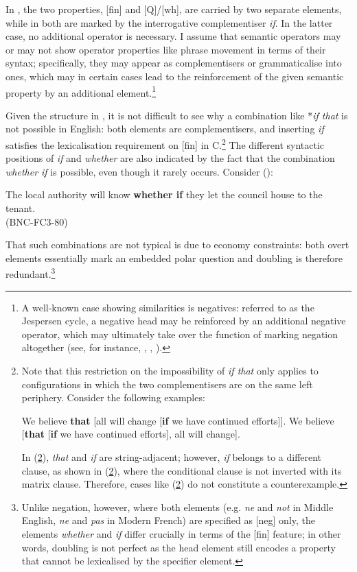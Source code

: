 In , the two properties, [fin] and [Q]/[wh], are carried by two separate elements, while in  both are marked by the interrogative complementiser \textit{if}. In the latter case, no additional operator is necessary. I assume that semantic operators may or may not show operator properties like phrase movement in terms of their syntax; specifically, they may appear as complementisers or grammaticalise into ones, which may in certain cases lead to the reinforcement of the given semantic property by an additional element.\footnote{A well-known case showing similarities is negatives: referred to as the Jespersen cycle, a negative head may be reinforced by an additional negative operator, which may ultimately take over the function of marking negation altogether (see, for instance, \citealt{wallage2008}, \citealt{vanderauwera2009}, \citealt{hoeksema2009}).}\largerpage

Given the structure in , it is not difficult to see why a combination like *\textit{if that} is not possible in English: both elements are complementisers, and inserting \textit{if} satisfies the lexicalisation requirement on [fin] in C.{\footnote{Note that this restriction on the impossibility of \textit{if that} only applies to configurations in which the two complementisers are on the same left periphery. Consider the following examples:

\ea We believe \textbf{that} [all will change [\textbf{if} we have continued efforts]]. \label{believethatif}
\ex We believe [\textbf{that} [\textbf{if} we have continued efforts], all will change]. \label{believeifthat}
\z

In (\ref{believeifthat}), \textit{that} and \textit{if} are string-adjacent; however, \textit{if} belongs to a different clause, as shown in (\ref{believethatif}), where the conditional clause is not inverted with its matrix clause. Therefore, cases like (\ref{believeifthat}) do not constitute a counterexample.}} The different syntactic positions of \textit{if} and \textit{whether} are also indicated by the fact that the combination \textit{whether if} is possible, even though it rarely occurs. Consider (\citealt[96, ex. 82]{vangelderen2004}):

\ea The local authority will know \textbf{whether if} they let the council house to the tenant.\\
(BNC-FC3-80)
\z

That such combinations are not typical is due to economy constraints: both overt elements essentially mark an embedded polar question and doubling is therefore redundant.\footnote{Unlike negation, however, where both elements (e.g. \textit{ne} and \textit{not} in Middle English, \textit{ne} and \textit{pas} in Modern French) are specified as [neg] only, the elements \textit{whether} and \textit{if} differ crucially in terms of the [fin] feature; in other words, doubling is not perfect as the head element still encodes a property that cannot be lexicalised by the specifier element.}


